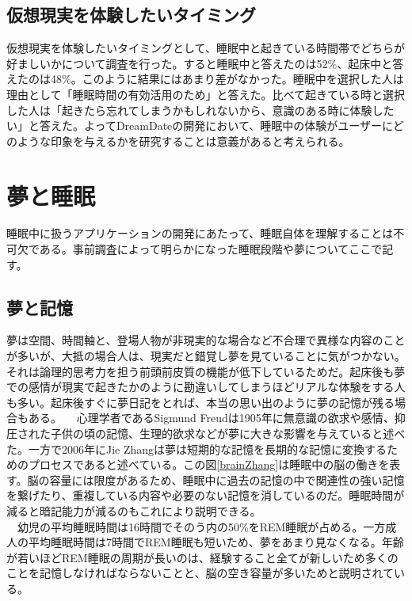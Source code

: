 \subsection{仮想現実を体験したいタイミング }
仮想現実を体験したいタイミングとして、睡眠中と起きている時間帯でどちらが好ましいかについて調査を行った。すると睡眠中と答えたのは52\%、起床中と答えたのは48\%。このように結果にはあまり差がなかった。睡眠中を選択した人は理由として「睡眠時間の有効活用のため」と答えた。比べて起きている時と選択した人は「起きたら忘れてしまうかもしれないから、意識のある時に体験したい」と答えた。よってDreamDateの開発において、睡眠中の体験がユーザーにどのような印象を与えるかを研究することは意義があると考えられる。

\section{夢と睡眠}
睡眠中に扱うアプリケーションの開発にあたって、睡眠自体を理解することは不可欠である。事前調査によって明らかになった睡眠段階や夢についてここで記す。

\subsection{夢と記憶}
夢は空間、時間軸と、登場人物が非現実的な場合など不合理で異様な内容のことが多いが、大抵の場合人は、現実だと錯覚し夢を見ていることに気がつかない。それは論理的思考力を担う前頭前皮質の機能が低下しているためだ\cite{cortex}。起床後も夢での感情が現実で起きたかのように勘違いしてしまうほどリアルな体験をする人も多い。起床後すぐに夢日記をとれば、本当の思い出のように夢の記憶が残る場合もある。
　心理学者であるSigmund Freudは1905年に無意識の欲求や感情、抑圧された子供の頃の記憶、生理的欲求などが夢に大きな影響を与えていると述べた\cite{freud}。一方で2006年にJie Zhangは夢は短期的な記憶を長期的な記憶に変換するためのプロセスであると述べている。この図\ref{brainZhang}は睡眠中の脳の働きを表す\cite{Zhang}。脳の容量には限度があるため、睡眠中に過去の記憶の中で関連性の強い記憶を繋げたり、重複している内容や必要のない記憶を消しているのだ\cite{Zhang}。睡眠時間が減ると暗記能力が減るのもこれにより説明できる。\\
　幼児の平均睡眠時間は16時間でそのう内の50\%をREM睡眠が占める。一方成人の平均睡眠時間は7時間でREM睡眠も短いため、夢をあまり見なくなる。年齢が若いほどREM睡眠の周期が長いのは、経験すること全てが新しいため多くのことを記憶しなければならないことと、脳の空き容量が多いためと説明されている。

